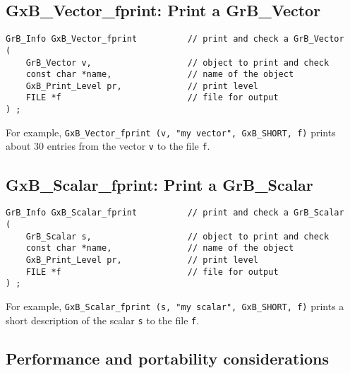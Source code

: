 \documentclass[12pt]{article}
\begin{document}
\subsection{{\sf GxB\_Vector\_fprint:} Print a {\sf GrB\_Vector}}

\begin{mdframed}[userdefinedwidth=6in]
{\footnotesize
\begin{verbatim}
GrB_Info GxB_Vector_fprint          // print and check a GrB_Vector
(
    GrB_Vector v,                   // object to print and check
    const char *name,               // name of the object
    GxB_Print_Level pr,             // print level
    FILE *f                         // file for output
) ;
\end{verbatim} } \end{mdframed}

For example, \verb'GxB_Vector_fprint (v, "my vector", GxB_SHORT, f)'
prints about 30 entries from the vector \verb'v' to the file \verb'f'.

\newpage
\subsection{{\sf GxB\_Scalar\_fprint:} Print a {\sf GrB\_Scalar}}

\begin{mdframed}[userdefinedwidth=6in]
{\footnotesize
\begin{verbatim}
GrB_Info GxB_Scalar_fprint          // print and check a GrB_Scalar
(
    GrB_Scalar s,                   // object to print and check
    const char *name,               // name of the object
    GxB_Print_Level pr,             // print level
    FILE *f                         // file for output
) ;
\end{verbatim} } \end{mdframed}

For example, \verb'GxB_Scalar_fprint (s, "my scalar", GxB_SHORT, f)'
prints a short description of the scalar \verb's' to the file \verb'f'.

\subsection{Performance and portability considerations}
\end{document}
